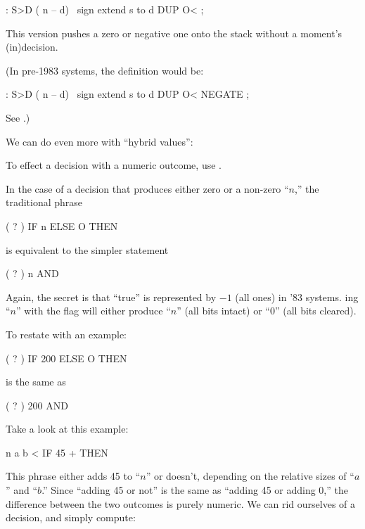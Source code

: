 \begin{Code}
: S>D  ( n -- d)  \ sign extend s to d
     DUP  O< ;
\end{Code}
This version pushes a zero or negative one onto the stack without a
moment's (in)decision.

\medbreak
(In pre-1983 systems, the definition would be:

\begin{Code}
: S>D  ( n -- d)  \ sign extend s to d
     DUP  O< NEGATE ;
\end{Code}
See .)%
\medbreak

%
We can do even more with ``hybrid values'':
%
\begin{tip}
To effect a decision with a numeric outcome, use .
\end{tip}
In the case of a decision that produces either zero or a non-zero ``$n$,''
the traditional phrase

\begin{Code}
( ? ) IF  n  ELSE  O  THEN
\end{Code}
is equivalent to the simpler statement

\begin{Code}
( ? )  n AND
\end{Code}
Again, the secret is that ``true'' is represented by $-1$ (all ones) in
'83 \Forth{} systems. ing ``$n$'' with the flag will either
produce ``$n$'' (all bits intact) or ``$0$'' (all bits cleared).

To restate with an example:

\begin{Code}
( ? )  IF  200  ELSE  O  THEN
\end{Code}
is the same as

\begin{Code}
( ? )  200 AND
\end{Code}
Take a look at this example:

\begin{Code}
n  a b <  IF  45 +  THEN
\end{Code}
This phrase either adds 45 to ``$n$'' or doesn't, depending on the
relative sizes of ``$a$'' and ``$b$.'' Since ``adding 45 or not'' is the
same as ``adding 45 or adding 0,'' the difference between the two outcomes
is purely numeric.  We can rid ourselves of a decision, and simply
compute:

